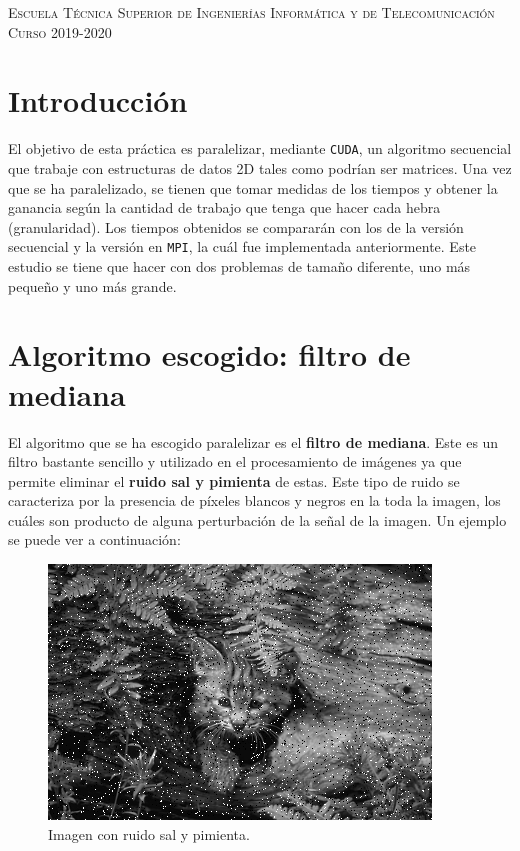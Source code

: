 \documentclass[11pt,a4paper]{article}
\begin{document}
\begin{titlepage}
\begin{minipage}{\textwidth}
\vspace{0.7cm}
\textsc{Escuela Técnica Superior de Ingenierías Informática y de Telecomunicación}\\
\vspace{1cm}
\textsc{Curso 2019-2020}
\end{minipage}
\end{titlepage}

\tableofcontents
\thispagestyle{empty}				%

\newpage

\setlength{\parskip}{1em}

\section{Introducción}

El objetivo de esta práctica es paralelizar, mediante \texttt{CUDA}, un algoritmo secuencial que
trabaje con estructuras de datos 2D tales como podrían ser matrices. Una vez que se ha
paralelizado, se tienen que tomar medidas de los tiempos y obtener la ganancia según la
cantidad de trabajo que tenga que hacer cada hebra (granularidad). Los tiempos
obtenidos se compararán con los de la versión secuencial y la versión en \texttt{MPI}, la cuál
fue implementada anteriormente. Este estudio se tiene que hacer con dos problemas de tamaño
diferente, uno más pequeño y uno más grande.

\section{Algoritmo escogido: filtro de mediana}

El algoritmo que se ha escogido paralelizar es el \textbf{filtro de mediana}. Este es un
filtro bastante sencillo y utilizado en el procesamiento de imágenes ya que permite eliminar
el \textbf{ruido sal y pimienta} de estas. Este tipo de ruido se caracteriza por la presencia
de píxeles blancos y negros en la toda la imagen, los cuáles son producto de alguna perturbación
de la señal de la imagen. Un ejemplo se puede ver a continuación:

\begin{figure}[H]
    \centering
    \includegraphics[scale=0.6]{img/cat.png}
    \caption{Imagen con ruido sal y pimienta.}
    \label{fig:cat}
\end{figure}
\end{document}
